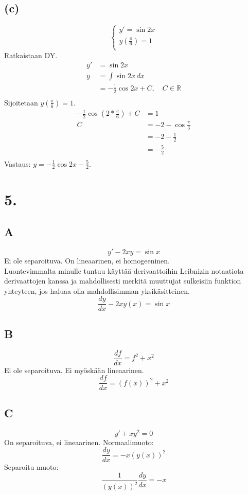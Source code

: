 \documentclass{article}
\begin{document}
\subsection*{(c)}
\[
  \begin{cases}
    y' = \sin 2x \\
    y(\frac{\pi}{6}) = 1 \\
  \end{cases}
\]
Ratkaistaan DY.
\begin{align*}
  y' &= \sin 2x \\
  y &= \int \sin 2x \,dx \\
    &= -\frac{1}{2} \cos 2x + C, \quad C \in \mathbb{R} \\
\end{align*}
Sijoitetaan $y(\frac{\pi}{6}) = 1$.
\begin{align*}
  -\frac{1}{2} \cos(2 * \frac{\pi}{6}) + C &= 1 \\
  C &= -2 - \cos \frac{\pi}{3} \\
    &= -2 - \frac{1}{2} \\
    &= -\frac{5}{2} \\
\end{align*}
Vastaus: $y = -\frac{1}{2} \cos 2x - \frac{5}{2}$.

\section*{5.}

\subsection*{A}
\[
  y' - 2xy = \sin x
\]
Ei ole separoituva. On lineaarinen, ei homogeeninen. \\
Luontevimmalta minulle tuntuu käyttää derivaattoihin Leibnizin notaatiota
derivaattojen kanssa ja mahdollisesti merkitä muuttujat sulkeisiin funktion
yhteyteen, jos haluaa olla mahdollisimman yksikäsitteinen.
\[
  \frac{dy}{dx} - 2xy(x) = \sin x
\]

\subsection*{B}
\[
  \frac{df}{dx} = f^2 + x^2
\]
Ei ole separoituva. Ei myöskään lineaarinen.
\[
  \frac{df}{dx} = (f(x))^2 + x^2
\]

\subsection*{C}
\[
  y' + xy^2 = 0
\]
On separoituva, ei lineaarinen. Normaalimuoto:
\[
  \frac{dy}{dx} = -x(y(x))^2
\]
Separoitu muoto:
\[
  \frac{1}{(y(x))^2} \frac{dy}{dx} = -x
\]
\end{document}
